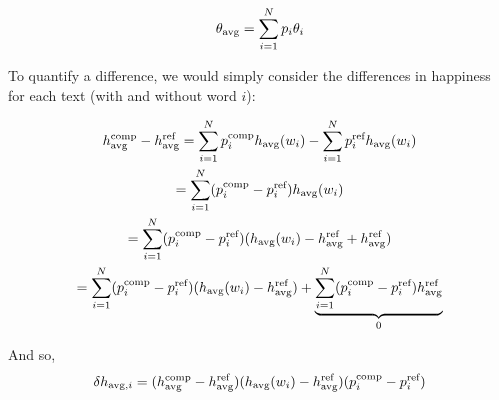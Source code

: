\begin{enumerate}
\[
\theta_{\textnormal{avg}}
=
\sum_{i=1}^{N}
p_i\theta_i
\]


To quantify a difference, we would simply consider the differences in happiness for each text (with and without word $i$):

\[
\begin{gathered}
	h^{\textnormal{comp}}_{\textnormal{avg}}
	-
	h^{\textnormal{ref}}_{\textnormal{avg}}
	=
	\sum_{i=1}^{N}p_i^{\textnormal{comp}}h_{\textnormal{avg}}(w_i)
	-
	\sum_{i=1}^{N}p_i^{\textnormal{ref}}h_{\textnormal{avg}}(w_i) \\
	=
	\sum_{i=1}^{N} (p_i^{\textnormal{comp}} - p_i^{\textnormal{ref}} )h_{\textnormal{avg}}(w_i) \\
	=
	\sum_{i=1}^{N} (p_i^{\textnormal{comp}} - p_i^{\textnormal{ref}} ) (h_{\textnormal{avg}}(w_i) - h^{\textnormal{ref}}_{\textnormal{avg}} + h^{\textnormal{ref}}_{\textnormal{avg}}) \\
	=
	\sum_{i=1}^{N} (p_i^{\textnormal{comp}} - p_i^{\textnormal{ref}} ) (h_{\textnormal{avg}}(w_i) - h^{\textnormal{ref}}_{\textnormal{avg}}) + 
	\underbrace{
		\sum_{i=1}^{N} (p_i^{\textnormal{comp}} - p_i^{\textnormal{ref}} ) h^{\textnormal{ref}}_{\textnormal{avg}}
	}_{0}
\end{gathered}
\]

And so,
\[
  \delta h_{\textnormal{avg},i}
=
(h^{\textnormal{comp}}_{\textnormal{avg}} - h^{\textnormal{ref}}_{\textnormal{avg}})
(h_{\textnormal{avg}}(w_i) - h^{\textnormal{ref}}_{\textnormal{avg}})
(p_i^{\textnormal{comp}} - p_i^{\textnormal{ref}} )
\]







   \solutionend

\end{enumerate}
